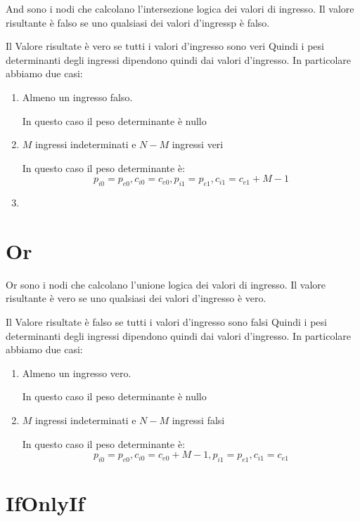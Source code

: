 \documentclass{article}
\begin{document}
  And sono i nodi che calcolano l'intersezione logica dei valori di ingresso.
  Il valore risultante \`e falso se uno qualsiasi dei valori d'ingressp \`e
  falso.
  
  Il Valore risultate \`e vero se tutti i valori d'ingresso sono veri
  Quindi i pesi determinanti degli ingressi dipendono quindi dai valori
  d'ingresso. In particolare abbiamo due casi:
  
  \begin{enumerate}
    \item Almeno un ingresso falso.
      
      In questo caso il peso determinante \`e nullo
    \item $M$ ingressi indeterminati e $N-M$ ingressi veri
      
      In questo caso il peso determinante \`e:
      \begin{equation}
	p_{i0}=p_{e0}, c_{i0}=c_{e0}, p_{i1}=p_{e1}, c_{i1}=c_{e1}+M-1
      \end{equation}
    \item
  \end{enumerate}
  
  \section{Or}
  
  Or sono i nodi che calcolano l'unione logica dei valori di ingresso.
  Il valore risultante \`e vero se uno qualsiasi dei valori d'ingresso \`e
  vero.
  
  Il Valore risultate \`e falso se tutti i valori d'ingresso sono falsi
  Quindi i pesi determinanti degli ingressi dipendono quindi dai valori
  d'ingresso. In particolare abbiamo due casi:
  
  \begin{enumerate}
    \item Almeno un ingresso vero.
      
      In questo caso il peso determinante \`e nullo
    \item $M$ ingressi indeterminati e $N-M$ ingressi falsi
      
      In questo caso il peso determinante \`e:
      \begin{equation}
	p_{i0}=p_{e0}, c_{i0}=c_{e0}+M-1, p_{i1}=p_{e1}, c_{i1}=c_{e1}
      \end{equation}
  \end{enumerate}
  
  \section{IfOnlyIf}
    
\end{document}
